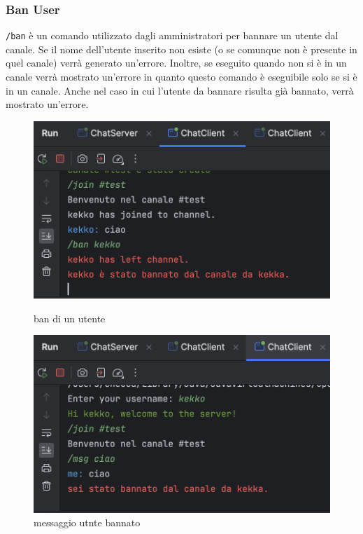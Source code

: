 \subsubsection{Ban User}
\item \texttt{/ban} è un comando utilizzato dagli amministratori per bannare un utente dal canale. Se il nome dell'utente inserito non esiste (o se comunque non è presente in quel canale) verrà generato un'errore. Inoltre, se eseguito quando non si è in un canale verrà mostrato un'errore in quanto questo comando è eseguibile solo se si è in un canale. Anche nel caso in cui l'utente da bannare risulta già bannato, verrà mostrato un'errore.
\begin{figure}[h]
  \centering
  \begin{minipage}{0.45\textwidth}
    \includegraphics[width=\linewidth]{imagens/outputs/10.png}
    \caption{ban di un utente}
  \end{minipage}\hfill
  \begin{minipage}{0.45\textwidth}
    \includegraphics[width=\linewidth]{imagens/outputs/10_2.png}
    \caption{messaggio utnte bannato}
  \end{minipage}\hfill
\end{figure}
\newpage

